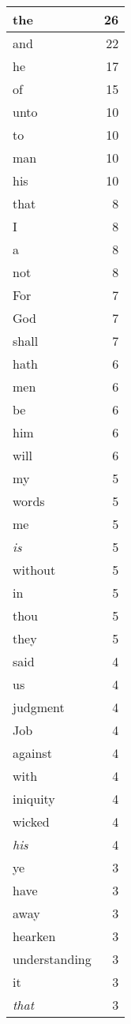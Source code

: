 \begin{center}
\begin{longtable}{l|r}
\hline \hline
\endlastfoot
the & 26 \\ \hline
and & 22 \\ \hline
he & 17 \\ \hline
of & 15 \\ \hline
unto & 10 \\ \hline
to & 10 \\ \hline
man & 10 \\ \hline
his & 10 \\ \hline
that & 8 \\ \hline
I & 8 \\ \hline
a & 8 \\ \hline
not & 8 \\ \hline
For & 7 \\ \hline
God & 7 \\ \hline
shall & 7 \\ \hline
hath & 6 \\ \hline
men & 6 \\ \hline
be & 6 \\ \hline
him & 6 \\ \hline
will & 6 \\ \hline
my & 5 \\ \hline
words & 5 \\ \hline
me & 5 \\ \hline
\emph{is} & 5 \\ \hline
without & 5 \\ \hline
in & 5 \\ \hline
thou & 5 \\ \hline
they & 5 \\ \hline
said & 4 \\ \hline
us & 4 \\ \hline
judgment & 4 \\ \hline
Job & 4 \\ \hline
against & 4 \\ \hline
with & 4 \\ \hline
iniquity & 4 \\ \hline
wicked & 4 \\ \hline
\emph{his} & 4 \\ \hline
ye & 3 \\ \hline
have & 3 \\ \hline
away & 3 \\ \hline
hearken & 3 \\ \hline
understanding & 3 \\ \hline
it & 3 \\ \hline
\emph{that} & 3 \\ \hline

\end{longtable}
\end{center}
